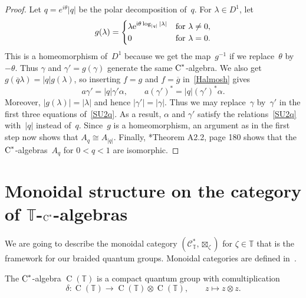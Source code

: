 \documentclass[a4paper]{amsart}
\numberwithin{equation}{section}
\theoremstyle{definition}
\theoremstyle{remark}
\begin{document}
\begin{proof}
  Let $q=e^{i\theta}{\left|{q}\right|}$ be the polar decomposition of~$q$.
  For $\lambda\in D^{1}$, let
  \[
  g(\lambda)=
  \begin{cases}
    \lambda
    \textup{e}^{\textup{i}\theta\log_{{\left|{q}\right|}}{\left|{\lambda}\right|}}&
    \text{for }\lambda\neq 0,\\
    0&\text{for }\lambda= 0.
  \end{cases}
  \]
  This is a homeomorphism of~$D^{1}$ because we get the map~\(g^{-1}\)
  if we replace~$\theta$ by~$-\theta$.  Thus $\gamma$ and
  $\gamma'=g(\gamma)$ generate the same ${\textup{C}^*}${\nobreakdash}-algebra.  We also
  get $g({\overline{q}}\lambda)={\left|{q}\right|}g(\lambda)$, so inserting $f=g$ and
  $f={\overline{g}}$ in~\eqref{Halmosh} gives
  \[
  a\gamma' ={\left|{q}\right|}\gamma'\alpha,\qquad
  a(\gamma')^{*} = {\left|{q}\right|} (\gamma')^{*}\alpha.
  \]
  Moreover, ${\left|{g(\lambda)}\right|}={\left|{\lambda}\right|}$ and hence
  ${\left|{\gamma'}\right|}={\left|{\gamma}\right|}$.  Thus we may replace~$\gamma$
  by~$\gamma'$ in the first three equations of~\eqref{SU2q}.  As a
  result, $\alpha$ and $\gamma'$ satisfy the relations~\eqref{SU2q}
  with~${\left|{q}\right|}$ instead of~$q$.  Since~\(g\) is a homeomorphism, an
  argument as in the first step now shows that ${{A}}_q\cong
  {{A}}_{{\left|{q}\right|}}$.
  Finally, \cite{Woronowicz:Twisted_SU2}*{Theorem A2.2, page 180}
  shows that the \({\textup{C}^*}\){\nobreakdash}-algebras~${{A}}_q$ for \(0<q<1\) are
  isomorphic.
\end{proof}

\section{Monoidal structure on the category of
  \texorpdfstring{$\mathbb{T}$-${\textup{C}^*}$}{T-C*}-algebras}
\label{tcat}

We are going to describe the monoidal category
$(\mathcal{C}^*_{\mathbb{T}},{\boxtimes}_{\zeta})$ for
$\zeta\in\mathbb{T}$ that is the framework for our braided quantum
groups.  Monoidal categories are defined
in~\cite{MacLane:Categories}.

The \({\textup{C}^*}\){\nobreakdash}-algebra \(\operatorname{C}(\mathbb{T})\) is a compact quantum
group with comultiplication
\[
\delta\colon \operatorname{C}(\mathbb{T}) \to \operatorname{C}(\mathbb{T}) {\otimes} \operatorname{C}(\mathbb{T}),
\qquad
z\mapsto z{\otimes} z.
\]
\end{document}
